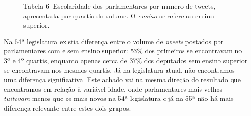 \begin{figure}[!ht]

\caption{Tabela 6: Escolaridade dos parlamentares por número de tweets,
apresentada por quartis de volume. O \textit{ensino} se refere ao ensino superior.\footnotemark}
\end{figure}


Na 54ª legislatura existia diferença entre o volume de \textit{tweets}
postados por parlamentares com e sem ensino superior: 53\% dos primeiros
se encontravam no 3º e 4º quartis, enquanto apenas cerca de 37\% dos
deputados sem ensino superior se encontravam nos mesmos quartis. Já na
legislatura atual, não encontramos uma diferença significativa. Este
achado vai na mesma direção do resultado que encontramos em relação à
variável idade, onde parlamentares mais velhos \textit{tuitavam} menos que
os mais novos na 54ª legislatura e já na 55ª não há mais diferença
relevante entre estes dois grupos.



